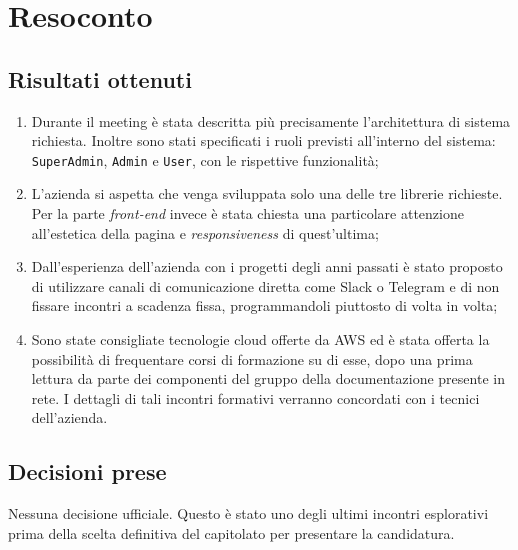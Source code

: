 \section{Resoconto}

\subsection{Risultati ottenuti}
\begin{enumerate}
    \item Durante il meeting è stata descritta più precisamente l'architettura di sistema richiesta. Inoltre sono stati specificati i ruoli previsti all'interno del sistema: \texttt{SuperAdmin}, \texttt{Admin} e \texttt{User}, con le rispettive funzionalità;
    \item L'azienda si aspetta che venga  sviluppata solo una delle tre librerie richieste. Per la parte \textit{front-end} invece è stata chiesta una particolare attenzione all'estetica della pagina e \textit{responsiveness} di quest'ultima;
    \item Dall'esperienza dell'azienda con i progetti degli anni passati è stato proposto di utilizzare canali di comunicazione diretta come Slack o Telegram e di non fissare incontri a scadenza fissa, programmandoli piuttosto di volta in volta;
    \item Sono state consigliate tecnologie cloud offerte da AWS ed è stata offerta la possibilità di frequentare corsi di formazione su di esse, dopo una prima lettura da parte dei componenti del gruppo della documentazione presente in rete. I dettagli di tali incontri formativi verranno concordati con i tecnici dell'azienda.
\end{enumerate}

\subsection{Decisioni prese}
Nessuna decisione ufficiale. Questo è stato uno degli ultimi incontri esplorativi prima della scelta definitiva del capitolato per presentare la candidatura.
